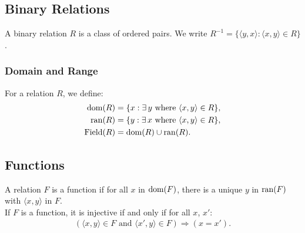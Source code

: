 \subsection{Binary Relations}

A binary relation $R$ is a class of ordered pairs.
We write $R^{-1} = \{\langle y, x \rangle : \langle x, y \rangle \in R\}$.

\subsubsection{Domain and Range}

For a relation $R$, we define: \begin{align*}
    \operatorname{dom}(R) &= \{x : \exists \, y \text{ where } \langle x, y \rangle \in R\}, \\
    \operatorname{ran}(R) &= \{y : \exists \, x \text{ where } \langle x, y \rangle \in R\}, \\
    \operatorname{Field}(R) &= \operatorname{dom}(R) \cup \operatorname{ran}(R).
\end{align*}

\subsection{Functions}

A relation $F$ is a function if for all $x$ in $\operatorname{dom}(F)$, there is a unique
$y$ in $\operatorname{ran}(F)$ with $\langle x, y \rangle$ in $F$.
\\[\baselineskip]
If $F$ is a function, it is injective if and only if for all $x$, $x'$:
\begin{align*}
    (\langle x, y \rangle \in F \text{ and } \langle x', y \rangle \in F) 
    \Rightarrow
    (x = x').
\end{align*} 
